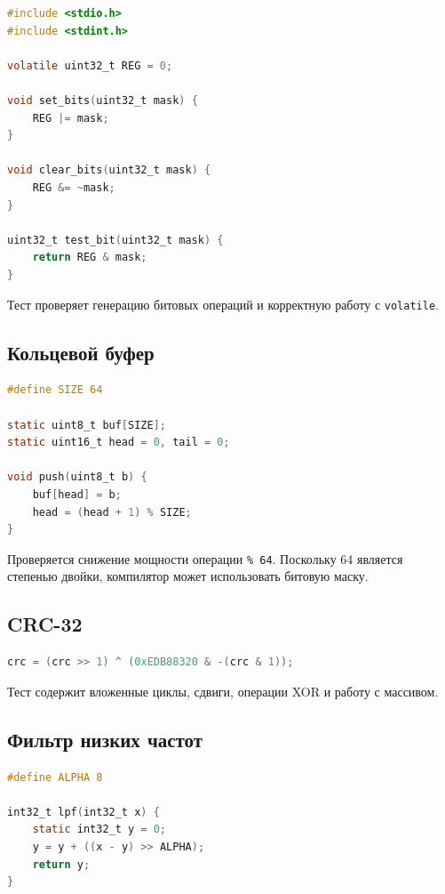 \documentclass[12pt,a4paper]{article}
\begin{document}
\begin{lstlisting}[language=C,caption={Работа с битовыми регистрами}]
#include <stdio.h>
#include <stdint.h>

volatile uint32_t REG = 0;

void set_bits(uint32_t mask) {
    REG |= mask;
}

void clear_bits(uint32_t mask) {
    REG &= ~mask;
}

uint32_t test_bit(uint32_t mask) {
    return REG & mask;
}
\end{lstlisting}

Тест проверяет генерацию битовых операций и корректную работу с \texttt{volatile}.

\subsection{Кольцевой буфер}

\begin{lstlisting}[language=C,caption={Кольцевой буфер}]
#define SIZE 64

static uint8_t buf[SIZE];
static uint16_t head = 0, tail = 0;

void push(uint8_t b) {
    buf[head] = b;
    head = (head + 1) % SIZE;
}
\end{lstlisting}

Проверяется снижение мощности операции \texttt{\% 64}. Поскольку 64 является степенью двойки, компилятор может использовать битовую маску.

\subsection{CRC-32}

\begin{lstlisting}[language=C,caption={Основная операция CRC-32}]
crc = (crc >> 1) ^ (0xEDB88320 & -(crc & 1));
\end{lstlisting}

Тест содержит вложенные циклы, сдвиги, операции XOR и работу с массивом.

\subsection{Фильтр низких частот}

\begin{lstlisting}[language=C,caption={Целочисленный фильтр низких частот}]
#define ALPHA 8

int32_t lpf(int32_t x) {
    static int32_t y = 0;
    y = y + ((x - y) >> ALPHA);
    return y;
}
\end{lstlisting}
\end{document}
